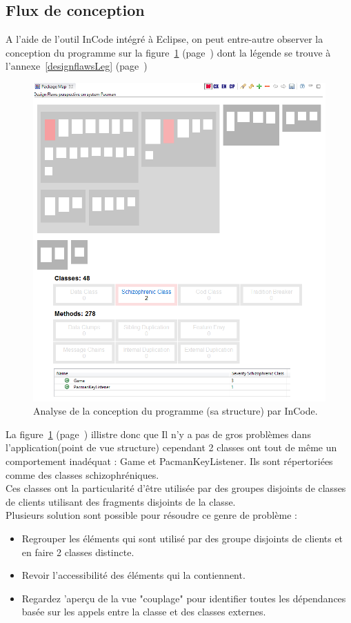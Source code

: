 \documentclass[12pt,a4paper,final]{article}
\newcommand{\annexe}[1]{annexe~\ref{#1} (page~\pageref{#1})}
\newcommand{\labelfigure}[1]{figure~\ref{#1} (page~\pageref{#1})}
\begin{document}
\subsection{Flux de conception}\label{sec:designflaws}
A l'aide de l'outil InCode intégré à Eclipse, on peut entre-autre observer la conception du programme sur la \labelfigure{designflaws} dont la légende se trouve à l'\annexe{designflawsLeg}
\begin{figure}[!h]
	\centering
	\includegraphics[width=\textwidth]{InCodeDesignFlaws.png}
	\caption{\label{designflaws}Analyse de la conception du programme (sa structure) par InCode.}
\end{figure}
La \labelfigure{designflaws} illistre donc que Il n'y a pas de gros problèmes dans l'application(point de vue structure) cependant 2 classes ont tout de même un comportement inadéquat : Game et PacmanKeyListener. Ils sont répertoriées comme des classes schizophréniques.\\
Ces classes ont la particularité  d'être utilisée par des groupes disjoints de classes de clients utilisant des fragments disjoints de la classe.\\
Plusieurs solution sont possible pour résoudre ce genre de problème :
\begin{itemize}
\item Regrouper les éléments qui sont utilisé par des groupe disjoints de clients et en faire 2 classes distincte.
\item Revoir l'accessibilité des éléments qui la contiennent.
\item Regardez 'aperçu de la vue "couplage" pour identifier toutes les dépendances basée sur les appels entre la classe et des classes externes.
\end{itemize}
\end{document}
